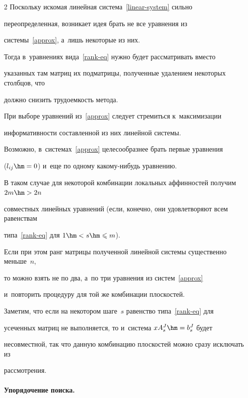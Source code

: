 \begin{multicols}{2}
Поскольку искомая линейная система~\eqref{linear-system} сильно 


переопределенная, возникает идея брать не все уравнения из 


системы~\eqref{approx}, а~лишь некоторые из них.


Тогда в~уравнениях вида~\eqref{rank-eq} нужно будет рас\-смат\-ри\-вать вместо 


указанных там мат\-риц их под\-мат\-ри\-цы, полученные удалением некоторых столбцов, что 


должно снизить трудоемкость метода.








При выборе уравнений из~\eqref{approx} следует стремиться к~максимизации 


информативности составленной из них линейной системы.


Возможно, в~системах~\eqref{approx} целесообразнее брать первые уравнения 


($l_{ij}\hm=0$) и~еще по одному ка\-ко\-му-ни\-будь уравнению.


В таком случае для некоторой комбинации локальных аффинностей получим $2m\hm>2n$ 


совместных линейных уравнений (если, конечно, они удовлетворяют всем равенствам 


типа~\eqref{rank-eq} для $1\hm<s\hm\leqslant m$).


Если при этом ранг матрицы полученной линейной системы существенно меньше~$n$, 


то можно взять не по два, а~по три уравнения из систем~\eqref{approx} 


и~повторить процедуру для той же комбинации плоскостей.


Заметим, что если на некотором шаге~$s$ равенство типа~\eqref{rank-eq} для 


усеченных матриц не выполняется, то и~система $xA^{J}_s\hm=b^{J}_s$ будет 


несовместной, так что данную комбинацию плоскостей можно сразу исключать из 


рассмотрения.





\vspace*{-12pt}








\paragraph*{Упорядочение поиска.}



\end{multicols}
